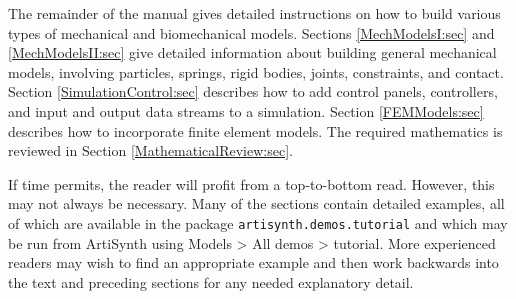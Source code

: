 The remainder of the manual gives detailed instructions on how to build
various types of mechanical and biomechanical models.  Sections
\ref{MechModelsI:sec} and \ref{MechModelsII:sec} give detailed
information about building general mechanical models, involving
particles, springs, rigid bodies, joints, constraints, and
contact. Section \ref{SimulationControl:sec} describes how to add
control panels, controllers, and input and output data streams to a
simulation.  Section \ref{FEMModels:sec} describes how to incorporate
finite element models. The required mathematics is reviewed in Section
\ref{MathematicalReview:sec}.

If time permits, the reader will profit from a top-to-bottom read.
However, this may not always be necessary. Many of the sections
contain detailed examples, all of which are available in
the package {\tt artisynth.demos.tutorial} and which may be run from
ArtiSynth using {\sf Models > All demos > tutorial}.
More experienced readers may wish to find an appropriate example and
then work backwards into the text and preceding sections for any
needed explanatory detail.

\mainmatter
















\iflatexml


\else
\printbibliography[title={References}]
%
%
\fi


